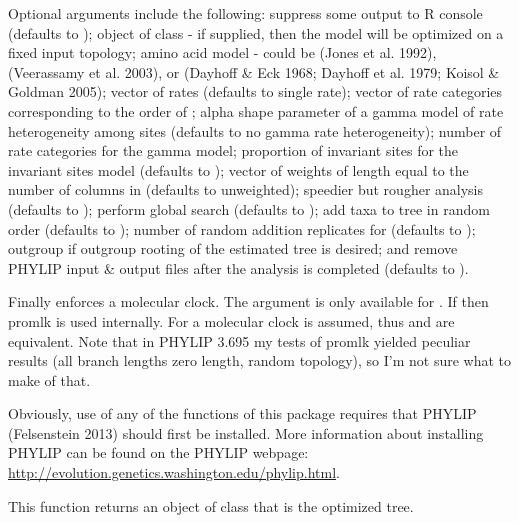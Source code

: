 \documentclass[a4paper]{book}
\begin{document}
\begin{Details}\relax
Optional arguments include the following:  suppress some output to R console (defaults to );  object of class  - if supplied, then the model will be optimized on a fixed input topology;  amino acid model - could be  (Jones et al. 1992),  (Veerassamy et al. 2003), or  (Dayhoff \& Eck 1968; Dayhoff et al. 1979; Koisol \& Goldman 2005);  vector of rates (defaults to single rate);  vector of rate categories corresponding to the order of ;  alpha shape parameter of a gamma model of rate heterogeneity among sites (defaults to no gamma rate heterogeneity);  number of rate categories for the gamma model;  proportion of invariant sites for the invariant sites model (defaults to );  vector of weights of length equal to the number of columns in  (defaults to unweighted);  speedier but rougher analysis (defaults to );  perform global search (defaults to );  add taxa to tree in random order (defaults to );  number of random addition replicates for  (defaults to );  outgroup if outgroup rooting of the estimated tree is desired; and  remove PHYLIP input \& output files after the analysis is completed (defaults to ).

Finally  enforces a molecular clock. The argument  is only available for . If  then promlk is used internally. For  a molecular clock is assumed, thus  and  are equivalent. Note that in PHYLIP 3.695 my tests of promlk yielded peculiar results (all branch lengths zero length, random topology), so I'm not sure what to make of that.

Obviously, use of any of the functions of this package requires that PHYLIP (Felsenstein 2013) should first be installed. More information about installing PHYLIP can be found on the PHYLIP webpage: \url{http://evolution.genetics.washington.edu/phylip.html}.
\end{Details}
%
\begin{Value}
This function returns an object of class  that is the optimized tree.
\end{Value}
\end{document}
